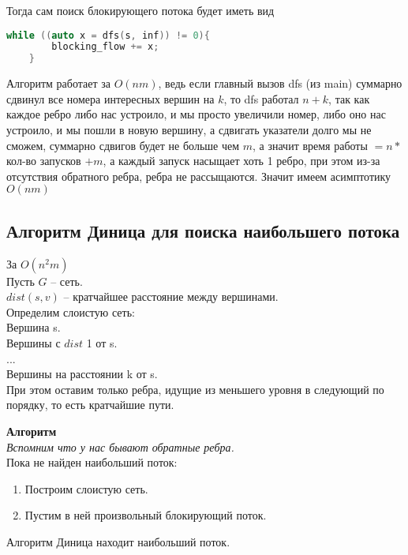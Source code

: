 Тогда сам поиск блокирующего потока будет иметь вид
\begin{lstlisting}[language = C++]
	while ((auto x = dfs(s, inf)) != 0){
		blocking_flow += x;
	}
\end{lstlisting}

Алгоритм работает за $O(nm)$, ведь если главный вызов dfs (из main) суммарно сдвинул все номера интересных вершин на $k$, то dfs работал  $n + k$, так как каждое ребро либо нас устроило, и мы просто увеличили номер, либо оно нас устроило, и мы пошли в новую вершину, а сдвигать указатели долго мы не сможем, суммарно сдвигов будет не больше чем  $m$, а значит время работы $ =  n * $ кол-во запусков $+ m$, а каждый запуск насыщает хоть 1 ребро, при этом из-за отсутствия обратного ребра, ребра не рассыщаются. Значит имеем асимптотику  $O(nm)$

\subsection{Алгоритм Диница для поиска наибольшего потока }

За $O(n^2 m)$ \\

Пусть $G$ -- сеть. \\
$dist(s, v)$ -- кратчайшее расстояние между вершинами. \\

Определим слоистую сеть: \\
Вершина s. \\
Вершины с $dist$ 1 от s. \\
	... \\
Вершины на расстоянии k от s. \\

При этом оставим только ребра, идущие из меньшего уровня в следующий по порядку, то есть кратчайшие пути.

\textbf{Алгоритм} \\
\textit{Вспомним что у нас бывают обратные ребра.}\\
Пока не найден наибольший поток:
\begin{enumerate}
	\item Построим слоистую сеть.
	\item Пустим в ней произвольный блокирующий поток.
\end{enumerate}

\begin{prop}
	Алгоритм Диница находит наибольший поток.	
\end{prop}

